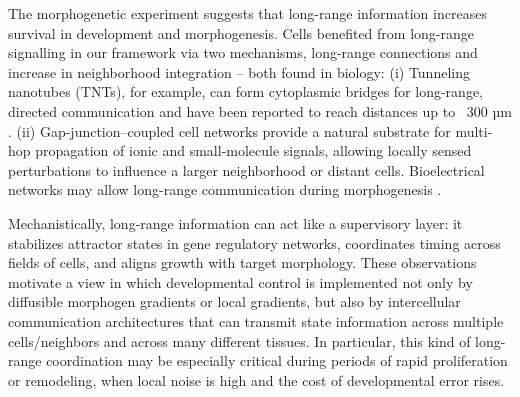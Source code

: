 \documentclass[letterpaper]{article}
\begin{document}

The morphogenetic experiment suggests that long-range information increases survival in development and morphogenesis. Cells benefited from long-range signalling in our framework via two mechanisms, long-range connections and increase in neighborhood integration 
{\color{black} -- both} found in biology{\color{black}:}
{\color{black} (i) Tunneling} nanotubes (TNTs), for example, {\color{black} can form}
 cytoplasmic bridges for long-range, directed communication and have been reported to reach distances up to ~300 µm \cite{ariazi2017tunneling}.
{\color{black}(ii) Gap}-junction–coupled cell networks provide a natural substrate for multi-hop propagation of ionic and small-molecule signals, allowing 
{\color{black} locally sensed perturbations}
to influence a larger neighborhood or distant cells. Bioelectrical networks may allow long-range communication during morphogenesis \cite{levin2014endogenous, levin2021bioelectric}.{\color{black}

}
Mechanistically, long-range information can act like a supervisory layer: it stabilizes attractor states in gene regulatory networks, coordinates timing across fields of cells, and aligns growth with target morphology. These observations motivate a view in which developmental control is implemented not only by diffusible morphogen gradients or local gradients, but also by intercellular communication architectures that can transmit state information across multiple cells/neighbors and across many different tissues. In particular, this kind of long-range coordination may be especially critical during periods of rapid proliferation or remodeling, when local noise is high and the cost of developmental error rises.
\end{document}
